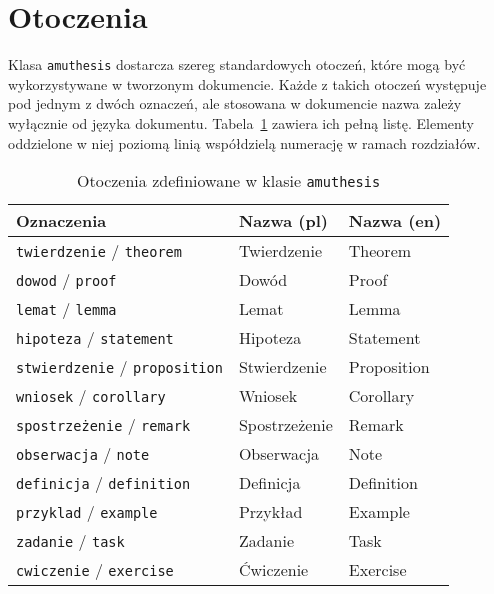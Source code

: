 \documentclass[oneside,polski]{amuthesis}
\begin{document}
\section{Otoczenia}

Klasa \texttt{amuthesis} dostarcza szereg standardowych otoczeń, które mogą być wykorzystywane w tworzonym dokumencie. Każde z takich otoczeń występuje pod jednym z dwóch oznaczeń, ale stosowana w dokumencie nazwa zależy wyłącznie od języka dokumentu. Tabela~\ref{table:amuthesis-otoczenia} zawiera ich pełną listę. Elementy oddzielone w niej poziomą linią współdzielą numerację w ramach rozdziałów.

\begin{table}[p]
  \caption{Otoczenia zdefiniowane w klasie \texttt{amuthesis}}
  \label{table:amuthesis-otoczenia}
  \begin{center}
  \begin{tabular}{lll}
    \toprule
    Oznaczenia & Nazwa (pl) & Nazwa (en)\\
    \midrule
    \texttt{twierdzenie} / \texttt{theorem} & Twierdzenie & Theorem\\
    \texttt{dowod} / \texttt{proof} & Dowód & Proof\\
    \texttt{lemat} / \texttt{lemma} & Lemat & Lemma\\
    \texttt{hipoteza} / \texttt{statement} & Hipoteza & Statement\\
    \texttt{stwierdzenie} / \texttt{proposition} & Stwierdzenie & Proposition\\
    \texttt{wniosek} / \texttt{corollary} & Wniosek & Corollary\\
    \texttt{spostrzeżenie} / \texttt{remark} & Spostrzeżenie & Remark\\
    \texttt{obserwacja} / \texttt{note} & Obserwacja & Note\\
    \midrule
    \texttt{definicja} / \texttt{definition} & Definicja & Definition\\
    \midrule
    \texttt{przyklad} / \texttt{example} & Przykład & Example\\
    \midrule
    \texttt{zadanie} / \texttt{task} & Zadanie & Task\\
    \texttt{cwiczenie} / \texttt{exercise} & Ćwiczenie & Exercise\\
    \bottomrule
  \end{tabular}
  \end{center}
\end{table}
\end{document}
